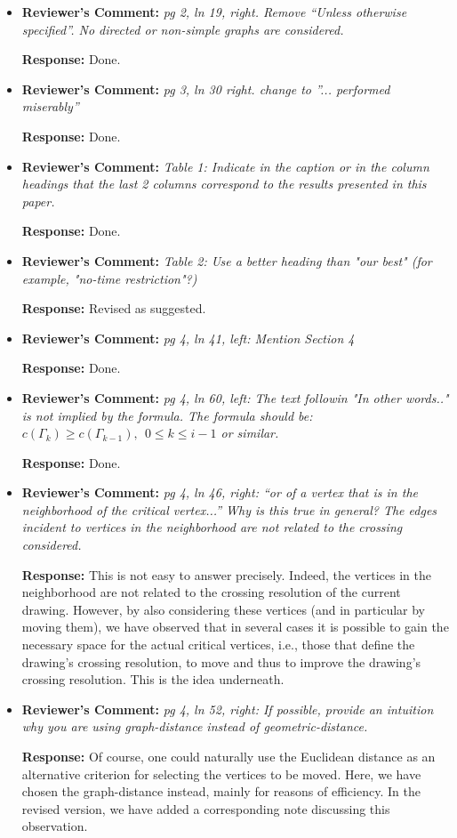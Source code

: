 \documentclass{article}
\newcommand{\rcomment}[1]{\vspace{0.3cm} \item \textbf{Reviewer's Comment:} {\em #1}}
\newcommand{\response}{\vspace{0.2cm} \textbf{Response: }}
\begin{document}
\begin{itemize}
\rcomment{pg 2, ln 19, right. Remove ``Unless otherwise specified''. No directed or non-simple graphs are considered.}

\response{Done.}

\rcomment{pg 3, ln 30 right. change to ''... performed miserably''}

\response{Done.}

\rcomment{Table 1: Indicate in the caption or in the column headings that the last 2 columns correspond to the results presented in this paper.}

\response{Done.}

\rcomment{Table 2: Use a better heading than "our best" (for example, "no-time restriction"?)}

\response{Revised as suggested.}

\rcomment{pg 4, ln 41, left: Mention Section 4}

\response{Done.}

\rcomment{pg 4, ln 60, left: The text followin "In other words.." is not implied by the formula. The formula should be: $c(\Gamma_{k}) \geq c(\Gamma_{k-1}), ~~0 \leq k \leq i-1$ or similar.}

\response{Done.}

\rcomment{pg 4, ln 46, right: ``or of a vertex that is in the neighborhood of the critical vertex...'' Why is this true in general? The edges incident to vertices in the neighborhood are not related to the crossing considered.}

\response{This is not easy to answer precisely. Indeed, the vertices in the neighborhood are not related to the crossing resolution of the current drawing. However, by also considering these vertices (and in particular by moving them), we have observed that in several cases it is possible to gain the necessary space for the actual critical vertices, i.e., those that define the drawing's crossing resolution, to move and thus to improve the drawing's crossing resolution. This is the idea underneath.}

\rcomment{pg 4, ln 52, right: If possible, provide an intuition why you are using graph-distance instead of geometric-distance.}

\response{Of course, one could naturally use the Euclidean distance as an alternative criterion for selecting the vertices to be moved. Here, we have chosen the graph-distance instead, mainly for reasons of efficiency. In the revised version, we have added a corresponding note discussing this observation.}


\end{itemize}
\end{document}
